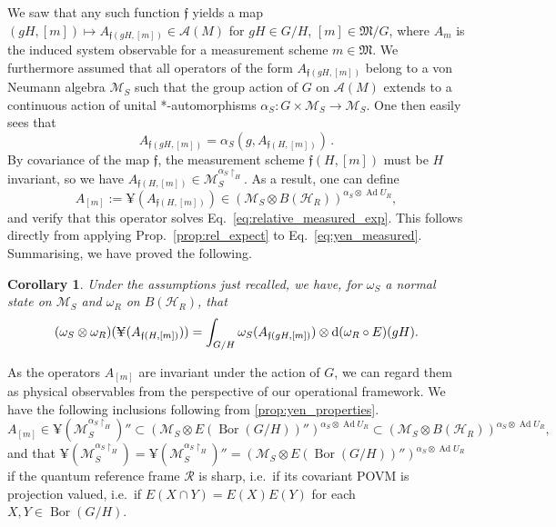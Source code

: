 \documentclass[sn-mathphys-num]{sn-jnl}%
\newcommand{\HH}{\mathcal{H}}
\newcommand{\MM}{\mathcal{M}}
\newcommand{\Af}{\mathscr{A}}
\DeclareMathOperator{\Bor}{Bor}
\DeclareMathOperator{\Ad}{Ad}
\newcommand{\diff}{\textup{d}}
\numberwithin{equation}{section}
\theoremstyle{thmstyleone}%
\newtheorem{corollary}[theorem]{Corollary}
\theoremstyle{thmstyletwo}%
\theoremstyle{thmstylethree}%
\begin{document}
    We saw that any such function $\mathfrak{f}$ yields a map $(gH,[m])\mapsto A_{\mathfrak{f}(gH,[m])}\in\Af(M)$ for $gH\in G/H$, $[m]\in\mathfrak{M}/G$, where $A_m$ is the induced system observable for a measurement scheme $m\in\mathfrak{M}$. We furthermore assumed that  all operators of the form $A_{\mathfrak{f}(gH,[m])}$ belong to a von Neumann algebra $\MM_S$ such that the group action of $G$ on $\Af(M)$ extends to a continuous action of unital *-automorphisms $\alpha_S:G\times \MM_S\to\MM_S$.
    One then easily sees that 
    \begin{equation}
        A_{\mathfrak{f}(gH,[m])}=\alpha_S(g,A_{\mathfrak{f}(H,[m])})\,.
    \end{equation}
    By covariance of the map $\mathfrak{f}$, the measurement scheme $\mathfrak{f}(H,[m])$ must be $H$ invariant, so we have $A_{\mathfrak{f}(H,[m])}\in \MM_S^{\alpha_S\restriction_H}$. As a result, one can define
    \begin{equation}\label{eq:yen_measured}
        A_{[m]}:=\yen(A_{\mathfrak{f}(H,[m])})\in (\MM_S\otimes B(\HH_R))^{\alpha_S\otimes \Ad U_R},
    \end{equation}
    and verify that this operator solves Eq.\ \eqref{eq:relative_measured_exp}. This follows directly from applying Prop.~\ref{prop:rel_expect} to Eq.~\eqref{eq:yen_measured}. Summarising, we have proved the following.
    \begin{corollary}
        \label{cor:yen_measured}Under the assumptions just recalled, we have, for $\omega_S$ a normal state on $\MM_S$ and $\omega_R$ on $B(\HH_R)$, that
        \begin{equation}
            (\omega_S\otimes\omega_R)(\yen(A_{\mathfrak{f}(H,[m])}))=\int_{G/H}\omega_S(A_{\mathfrak{f}(gH,[m])})\otimes \diff(\omega_R\circ E)(gH).
        \end{equation}
    \end{corollary}
    
    
    As the operators $A_{[m]}$ are invariant under the action of $G$, we can regard them as physical observables from the perspective of our operational framework. We have the following inclusions following from \ref{prop:yen_properties}.
    \begin{equation}
         A_{[m]}\in \yen(\MM_S^{\alpha_S\restriction_H})''\subset(\MM_S\otimes E(\Bor(G/H))'')^{\alpha_S\otimes\Ad { U_R}}\subset (\MM_S\otimes B(\HH_R))^{\alpha_S\otimes\Ad { U_R}},
     \end{equation}
     and that $\yen(\MM_S^{\alpha_S\restriction_H})=\yen(\MM_S^{\alpha_S\restriction_H})''=(\MM_S\otimes E(\Bor(G/H))'')^{\alpha_S\otimes\Ad { U_R}}$ if the quantum reference frame $\mathcal{R}$ is sharp, i.e.\ if its covariant POVM is projection valued, i.e.~if $E(X\cap Y)=E(X)E(Y)$ for each $X,Y\in\Bor(G/H)$.
\end{document}
